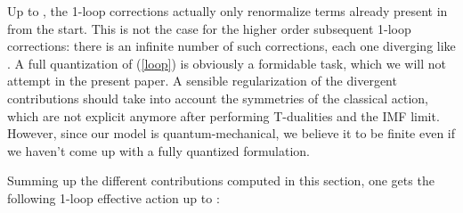 \documentclass[a4paper,11pt]{article}
\begin{document}
Up to \coordHE{}, the 1-loop corrections actually only renormalize terms already present in 
\coordHE{} from the start. This is not the case for the higher order subsequent 1-loop corrections: 
there is an infinite number of such corrections, each one diverging like \myHighlight{$\Lambda$}\coordHE{}. 
A full quantization of (\ref{loop}) is obviously a formidable task, which we will not attempt
in the present paper. A sensible regularization of the divergent contributions should take into account
the symmetries of the classical action, which are not explicit anymore after performing T-dualities and
the IMF limit. However, since our model is quantum-mechanical, we believe it to be finite even if we haven't
come up with a fully quantized formulation. 

Summing up the different contributions computed in this section, one gets the following 1-loop effective action 
up to \coordHE{}:
\end{document}
